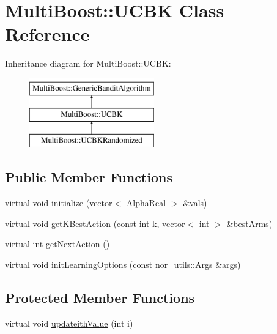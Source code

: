 \hypertarget{classMultiBoost_1_1UCBK}{\section{Multi\-Boost\-:\-:U\-C\-B\-K Class Reference}
\label{classMultiBoost_1_1UCBK}
}
Inheritance diagram for Multi\-Boost\-:\-:U\-C\-B\-K\-:\begin{figure}[H]
\begin{center}
\leavevmode
\includegraphics[height=3.000000cm]{classMultiBoost_1_1UCBK}
\end{center}
\end{figure}
\subsection*{Public Member Functions}
\begin{DoxyCompactItemize}
\item 
virtual void \hyperlink{classMultiBoost_1_1UCBK_a44652733dc9e14ae0963e3b9233a35fe}{initialize} (vector$<$ \hyperlink{Defaults_8h_a80184c4fd10ab70a1a17c5f97dcd1563}{Alpha\-Real} $>$ \&vals)
\item 
virtual void \hyperlink{classMultiBoost_1_1UCBK_a4569ed0ec4eaf87bb0c4560be8d9aeb5}{get\-K\-Best\-Action} (const int k, vector$<$ int $>$ \&best\-Arms)
\item 
virtual int \hyperlink{classMultiBoost_1_1UCBK_a66e7385f325f764cc5264ac109a0837b}{get\-Next\-Action} ()
\item 
virtual void \hyperlink{classMultiBoost_1_1UCBK_ab407ed66be89cba5a44deec3b962df7e}{init\-Learning\-Options} (const \hyperlink{classnor__utils_1_1Args}{nor\-\_\-utils\-::\-Args} \&args)
\end{DoxyCompactItemize}
\subsection*{Protected Member Functions}
\begin{DoxyCompactItemize}
\item 
virtual void \hyperlink{classMultiBoost_1_1UCBK_a56d9c14616eaa82858b504603bcd077a}{updateith\-Value} (int i)
\end{DoxyCompactItemize}
